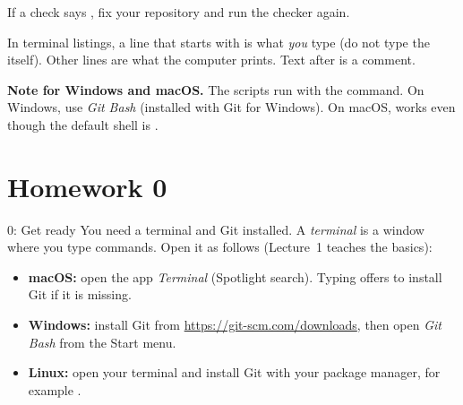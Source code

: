 If a check says , fix your repository and run the checker again.

In terminal listings, a line that starts with \code{\$} is what \emph{you} type (do not type the \code{\$} itself). Other lines are what the computer prints. Text after \code{\#} is a comment.

\textbf{Note for Windows and macOS.} The scripts run with the  command. On Windows, use \emph{Git Bash} (installed with Git for Windows). On macOS,  works even though the default shell is .

\section{Homework 0}

\begin{homework}{0: Get ready}
You need a terminal and Git installed. A \emph{terminal} is a window where you type commands. Open it as follows (Lecture~1 teaches the basics):
\begin{itemize}
  \item \textbf{macOS:} open the app \emph{Terminal} (Spotlight search). Typing  offers to install Git if it is missing.
  \item \textbf{Windows:} install Git from \url{https://git-scm.com/downloads}, then open \emph{Git Bash} from the Start menu.
  \item \textbf{Linux:} open your terminal and install Git with your package manager, for example .
\end{itemize}


\end{homework}
